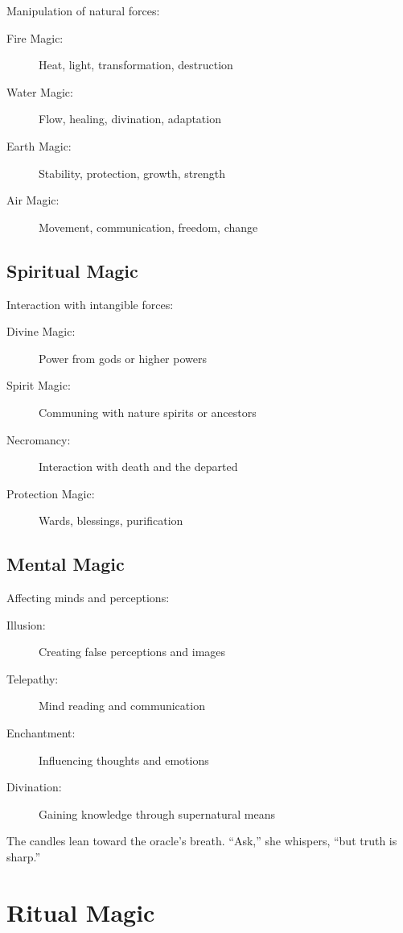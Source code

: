 \documentclass[11pt,twoside,openany]{book}
\begin{document}
Manipulation of natural forces:
\begin{description}
\item[Fire Magic:] Heat, light, transformation, destruction
\item[Water Magic:] Flow, healing, divination, adaptation
\item[Earth Magic:] Stability, protection, growth, strength
\item[Air Magic:] Movement, communication, freedom, change
\end{description}

\subsection*{Spiritual Magic}

Interaction with intangible forces:
\begin{description}
\item[Divine Magic:] Power from gods or higher powers
\item[Spirit Magic:] Communing with nature spirits or ancestors
\item[Necromancy:] Interaction with death and the departed
\item[Protection Magic:] Wards, blessings, purification
\end{description}

\subsection*{Mental Magic}

Affecting minds and perceptions:
\begin{description}
\item[Illusion:] Creating false perceptions and images
\item[Telepathy:] Mind reading and communication
\item[Enchantment:] Influencing thoughts and emotions
\item[Divination:] Gaining knowledge through supernatural means
\end{description}

\begin{tcolorbox}[colback=gray!5!white, colframe=gray!75!black, title=Vignette, fonttitle=\bfseries,breakable]
The candles lean toward the oracle's breath. ``Ask,'' she whispers, ``but truth is sharp.''
\end{tcolorbox}

\section*{Ritual Magic} 
\end{document}
